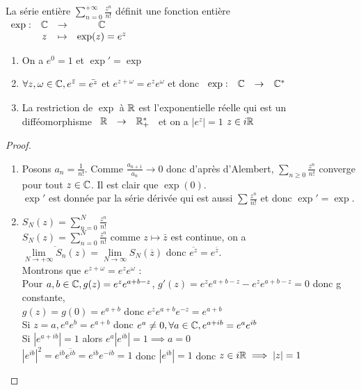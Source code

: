 \documentclass[]{report}
\begin{document}
\begin{prop}{}{}
    La série entière $\sum_{n=0}^{+\infty}\frac{z^n}{n!}$ définit une fonction entière $\begin{array}{ccccc}
\exp : & \mathbb{C} & \to & \mathbb{C} \\
  & z & \mapsto & \exp (z)=e^z
\end{array}$\\
\begin{enumerate}
    \item On a $e^0=1$ et $\exp'=\exp$
    \item $\forall z, \omega \in \mathbb{C}, e^{\bar{z}}=\bar{e^z} $ et  $e^{z+\omega}=e^ze^\omega$ et donc $\begin{array}{ccccc}
\exp : & \mathbb{C} & \to & \mathbb{C}^*
\end{array}$
    \item La restriction de $\exp$ à $\mathbb{R}$ est l'exponentielle réelle qui est un difféomorphisme $\begin{array}{ccccc}
\mathbb{R} & \to &  \mathbb{R}_+^*
\end{array}$ et on a $|e^z|=1$ \ssi $z\in i\mathbb{R}$
\end{enumerate}
\end{prop}

\begin{proof}{}{}
    \begin{enumerate}
        \item Posons $a_n=\frac{1}{n!}$. Comme $\frac{a_{n+1}}{a_n} \longrightarrow 0$ donc d'après d'Alembert, $\sum_{n\ge0}\frac{z^n}{n!}$ converge pour tout $z\in\mathbb{C}$. Il est clair que $\exp(0)$.\\
        $\exp'$ est donnée par la série dérivée qui est aussi $\sum\frac{z^n}{n!}$ et donc $\exp'=\exp$.
        \item $S_N(z)=\sum_{n=0}^N\frac{z^n}{n!}$\\
        $S_N(z)=\sum_{n=0}^N\frac{z^n}{n!}$ comme $z \mapsto \bar{z}$ est continue, on a $\overline{\lim\limits_{N\to+\infty}S_n(z)}=\lim\limits_{N\to \infty}S_N(\overline{z})$ donc $\overline{e^z}=e^{\bar{z}}$.\\
        Montrons que $e^{z+\omega}=e^ze^\omega$ :\\
        Pour $a,b\in \mathbb{C},g(z)=e^ze^{a+b-z}$, $g'(z)=e^ze^{a+b-z}-e^ze^{a+b-z}=0$ donc g constante, \\$g(z)=g(0)=e^{a+b}$ donc $e^ze^{a+b}e^{-z}=e^{a+b}$\\
        Si $z=a,e^ae^b=e^{a+b}$ donc $e^a\neq0, \forall a\in\mathbb{C}, e^{a+ib}=e^ae^{ib}$\\
        Si $|e^{a+ib}|=1$ alors $e^a|e^{ib}|=1\implies a=0$\\
        $|e^{ib}|^2=e^{ib}\overline{e^{ib}}=e^{ib}e^{-ib}=1$ donc $|e^{ib}|=1$ donc $z\in i\mathbb{R}\implies |z|=1$
    \end{enumerate}
\end{proof}
\end{document}
